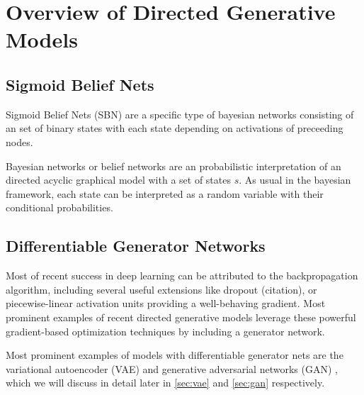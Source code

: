 
\newpage

\section{Overview of Directed Generative Models}
\label{sec:overview}

\subsection{Sigmoid Belief Nets}
\label{par:overview_sbn}
Sigmoid Belief Nets (SBN) are a specific type of bayesian networks consisting of an set of binary states with each state depending on activations of preceeding nodes.


Bayesian networks or belief networks are an probabilistic interpretation of an directed acyclic graphical model with a set of states $s$.
As usual in the bayesian framework, each state can be interpreted as a random variable with their conditional probabilities.



\subsection{Differentiable Generator Networks}
Most of recent success in deep learning can be attributed to the backpropagation algorithm, including several useful extensions like dropout (citation), or piecewise-linear activation units providing a well-behaving gradient.
Most prominent examples of recent directed generative models leverage these powerful gradient-based optimization techniques by including a generator network.

Most prominent examples of models with differentiable generator nets are the variational autoencoder (VAE) \cite{vae:2014} and generative adversarial networks (GAN) \cite{gan:2014}, which we will discuss in detail later in \ref{sec:vae} and \ref{sec:gan} respectively.


